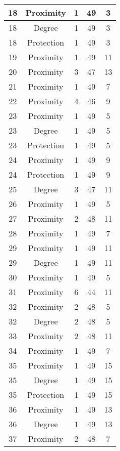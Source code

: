 \documentclass[results.tex]{subfiles}
\begin{document}
\begin{center}
\begin{tabular}{| c || c | c | c | c |}
    \hline
    18 & Proximity & 1 & 49 & 3 \\ 
    \hline
    18 & Degree & 1 & 49 & 3 \\ 
    \hline
    18 & Protection & 1 & 49 & 3 \\ 
    \hline
    19 & Proximity & 1 & 49 & 11 \\ 
    \hline
    20 & Proximity & 3 & 47 & 13 \\ 
    \hline
    21 & Proximity & 1 & 49 & 7 \\ 
    \hline
    22 & Proximity & 4 & 46 & 9 \\ 
    \hline
    23 & Proximity & 1 & 49 & 5 \\ 
    \hline
    23 & Degree & 1 & 49 & 5 \\ 
    \hline
    23 & Protection & 1 & 49 & 5 \\ 
    \hline
    24 & Proximity & 1 & 49 & 9 \\ 
    \hline
    24 & Protection & 1 & 49 & 9 \\ 
    \hline
    25 & Degree & 3 & 47 & 11 \\ 
    \hline
    26 & Proximity & 1 & 49 & 5 \\ 
    \hline
    27 & Proximity & 2 & 48 & 11 \\ 
    \hline
    28 & Proximity & 1 & 49 & 7 \\ 
    \hline
    29 & Proximity & 1 & 49 & 11 \\ 
    \hline
    29 & Degree & 1 & 49 & 11 \\ 
    \hline
    30 & Proximity & 1 & 49 & 5 \\ 
    \hline
    31 & Proximity & 6 & 44 & 11 \\ 
    \hline
    32 & Proximity & 2 & 48 & 5 \\ 
    \hline
    32 & Degree & 2 & 48 & 5 \\ 
    \hline
    33 & Proximity & 2 & 48 & 11 \\ 
    \hline
    34 & Proximity & 1 & 49 & 7 \\ 
    \hline
    35 & Proximity & 1 & 49 & 15 \\ 
    \hline
    35 & Degree & 1 & 49 & 15 \\ 
    \hline
    35 & Protection & 1 & 49 & 15 \\ 
    \hline
    36 & Proximity & 1 & 49 & 13 \\ 
    \hline
    36 & Degree & 1 & 49 & 13 \\ 
    \hline
    37 & Proximity & 2 & 48 & 7 \\ 

\end{tabular}
\end{center}
\end{document}
